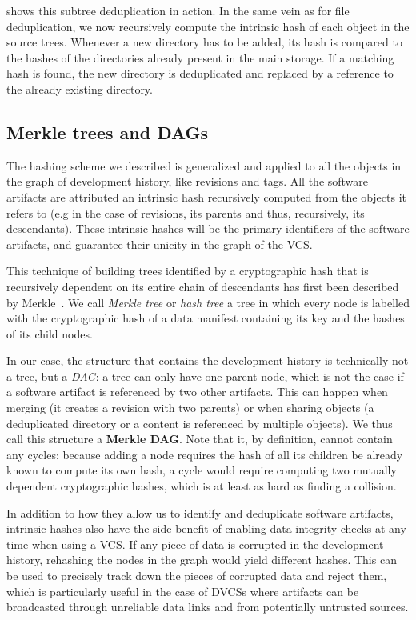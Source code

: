  shows this subtree deduplication in action. In
the same vein as for file deduplication, we now recursively compute the
intrinsic hash of each object in the source trees. Whenever a new directory has
to be added, its hash is compared to the hashes of the directories already
present in the main storage. If a matching hash is found, the new directory is
deduplicated and replaced by a reference to the already existing directory.

\subsection{Merkle trees and \glspl{DAG}}

The hashing scheme we described is generalized and applied to all the objects
in the graph of development history, like revisions and tags. All the software
artifacts are attributed an intrinsic hash recursively computed from the
objects it refers to (e.g in the case of revisions, its parents and thus,
recursively, its descendants). These intrinsic hashes will be the primary
identifiers of the software artifacts, and guarantee their unicity in the graph
of the \gls{VCS}.

This technique of building trees identified by a cryptographic hash that is
recursively dependent on its entire chain of descendants has first been
described by Merkle~\cite{Merkle}. We call \emph{Merkle tree} or \emph{hash
tree} a tree in which every node is labelled with the cryptographic hash of a
data manifest containing its key and the hashes of its child nodes.

In our case, the structure that contains the development history is technically
not a tree, but a \emph{\gls{DAG}}: a tree can only have one parent node, which
is not the case if a software artifact is referenced by two other artifacts.
This can happen when merging (it creates a revision with two parents) or when
sharing objects (a deduplicated directory or a content is referenced by
multiple objects). We thus call this structure a \textbf{Merkle DAG}. Note that
it, by definition, cannot contain any cycles: because adding a node requires
the hash of all its children be already known to compute its own hash, a cycle
would require computing two mutually dependent cryptographic hashes, which is
at least as hard as finding a collision.

In addition to how they allow us to identify and deduplicate software
artifacts, intrinsic hashes also have the side benefit of enabling data
integrity checks at any time when using a \gls{VCS}. If any piece of data is
corrupted in the development history, rehashing the nodes in the graph would
yield different hashes. This can be used to precisely track down the pieces of
corrupted data and reject them, which is particularly useful in the case of
\glspl{DVCS} where artifacts can be broadcasted through unreliable data links and
from potentially untrusted sources.

